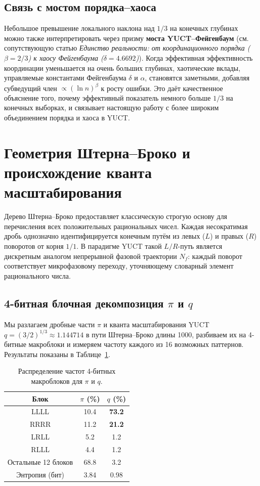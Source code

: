 \documentclass[12pt,a4paper]{article}
\begin{document}
	\subsection{Связь с мостом порядка–хаоса}
	Небольшое превышение локального наклона над \(1/3\) на конечных глубинах можно также интерпретировать через призму \textbf{моста YUCT–Фейгенбаум} (см. сопутствующую статью \emph{Единство реальности: от координационного порядка (\(\beta=2/3\)) к хаосу Фейгенбаума (\(\delta=4.6692\))}). Когда эффективная эффективность координации уменьшается на очень больших глубинах, хаотические вклады, управляемые константами Фейгенбаума \(\delta\) и \(\alpha\), становятся заметными, добавляя субведущий член \(\propto (\ln n)^{\beta}\) к росту ошибки. Это даёт качественное объяснение того, почему эффективный показатель немного больше \(1/3\) на конечных выборках, и связывает настоящую работу с более широким объединением порядка и хаоса в YUCT.
	
	\section{Геометрия Штерна–Броко и происхождение кванта масштабирования}
	\label{sec:stern-brocot}
	
	Дерево Штерна–Броко предоставляет классическую строгую основу для перечисления всех положительных рациональных чисел. Каждая несократимая дробь однозначно идентифицируется конечным путём из левых (\(L\)) и правых (\(R\)) поворотов от корня \(1/1\). В парадигме YUCT такой \(L/R\)-путь является дискретным аналогом непрерывной фазовой траектории \(N_f\): каждый поворот соответствует микрофазовому переходу, уточняющему словарный элемент рационального числа.
	
	\subsection{4-битная блочная декомпозиция \(\pi\) и \(q\)}
	
	Мы разлагаем дробные части \(\pi\) и кванта масштабирования YUCT \(q = (3/2)^{1/3} \approx 1.144714\) в пути Штерна–Броко длины 1000, разбиваем их на 4-битные макроблоки и измеряем частоту каждого из 16 возможных паттернов. Результаты показаны в Таблице~\ref{tab:block-spectra}.
	
	\begin{table}[htbp]
		\centering
		\caption{Распределение частот 4-битных макроблоков для \(\pi\) и \(q\).}
		\label{tab:block-spectra}
		\begin{tabular}{c c c}
			\toprule
			Блок & \(\pi\) (\%) & \(q\) (\%) \\
			\midrule
			LLLL & 10.4 & \textbf{73.2} \\
			RRRR & 11.2 & \textbf{21.2} \\
			LRLL & 5.2 & 1.2 \\
			RLLL & 4.4 & 1.2 \\
			Остальные 12 блоков & 68.8 & 3.2 \\
			\midrule
			Энтропия (бит) & 3.84 & 0.98 \\
			\bottomrule
		\end{tabular}
	\end{table}
	
\end{document}
